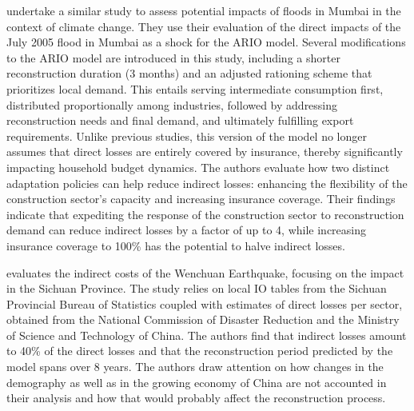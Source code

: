 \textcite{ranger-2010-asses-poten} undertake a similar study to
assess potential impacts of floods in Mumbai in the context of climate change.
They use their evaluation of the direct impacts of the July 2005 flood in Mumbai
as a shock for the ARIO model.  Several modifications to the ARIO model are
introduced in this study, including a shorter reconstruction duration (3 months)
and an adjusted rationing scheme that prioritizes local demand. This entails
serving intermediate consumption first, distributed proportionally among
industries, followed by addressing reconstruction needs and final demand, and
ultimately fulfilling export requirements. Unlike previous studies, this
version of the model no longer assumes that direct losses are entirely
covered by insurance, thereby significantly impacting household budget dynamics.
The authors evaluate how two distinct adaptation policies can help reduce indirect
losses: enhancing the flexibility of the construction sector's capacity and
increasing insurance coverage. Their findings indicate that expediting the
response of the construction sector to reconstruction demand can reduce indirect losses
by a factor of up to 4, while increasing insurance coverage to 100\% has the
potential to halve indirect losses.

\textcite{wu-2011-region-indir} evaluates the
indirect costs of the Wenchuan Earthquake, focusing on the impact in the Sichuan
Province. The study relies on local IO tables from the Sichuan Provincial Bureau of
Statistics coupled with estimates of direct losses per sector, obtained
from the National Commission of Disaster Reduction and the Ministry of Science
and Technology of China. The authors find that indirect losses amount to 40\% of the
direct losses and that the reconstruction period predicted by the model spans
over 8 years. The authors draw attention on how changes in the demography as
well as in the growing  economy of China are not accounted in their analysis and
how that would probably affect the reconstruction process.

